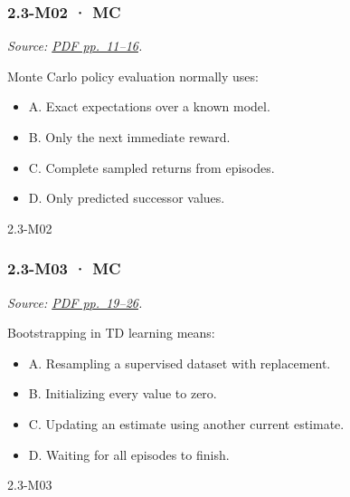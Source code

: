 \noindent\begin{minipage}{\linewidth}

\subsubsection{2.3-M02 · MC}\label{m02-mc-5}

\emph{Source:
\href{../Lecture\%20Slides/2.3.\%20Q-learning.pdf\#page=11}{PDF
pp.~11--16}.}

Monte Carlo policy evaluation normally uses:

\begin{itemize}
\tightlist
\item
  A. Exact expectations over a known model.
\item
  B. Only the next immediate reward.
\item
  C. Complete sampled returns from episodes.
\item
  D. Only predicted successor values.
\end{itemize}

\begin{solution}[8mm]{2.3-M02}

\end{solution}
\end{minipage}\par\medskip

\noindent\begin{minipage}{\linewidth}

\subsubsection{2.3-M03 · MC}\label{m03-mc-5}

\emph{Source:
\href{../Lecture\%20Slides/2.3.\%20Q-learning.pdf\#page=19}{PDF
pp.~19--26}.}

Bootstrapping in TD learning means:

\begin{itemize}
\tightlist
\item
  A. Resampling a supervised dataset with replacement.
\item
  B. Initializing every value to zero.
\item
  C. Updating an estimate using another current estimate.
\item
  D. Waiting for all episodes to finish.
\end{itemize}

\begin{solution}[8mm]{2.3-M03}

\end{solution}
\end{minipage}\par\medskip

